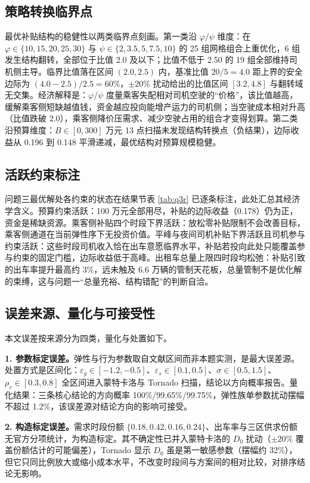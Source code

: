 \documentclass[12pt,a4paper]{ctexart}
\begin{document}
\subsection{策略转换临界点}

最优补贴结构的稳健性以两类临界点刻画。第一类沿 $\varphi/\psi$ 维度：在 $\varphi\in\{10,15,20,25,30\}$ 与 $\psi\in\{2,3.5,5,7.5,10\}$ 的 25 组网格组合上重优化，6 组发生结构翻转，全部位于比值 2.0 及以下；比值不低于 2.50 的 19 组全部维持司机侧主导。临界比值落在区间 $(2.0,2.5)$ 内，基准比值 $20/5=4.0$ 距上界的安全边际为 $(4.0-2.5)/2.5=60\%$，$\pm 20\%$ 扰动给出的比值区间 $[3.2,4.8]$ 与翻转域无交集。经济解释是：$\varphi/\psi$ 度量乘客失配相对司机空驶的“价格”，该比值越高，缓解乘客侧短缺越值钱，资金越应投向能增产运力的司机侧；当空驶成本相对升高（比值跌破 2.0），乘客侧降价压需求、减少空驶占用的组合才变得划算。第二类沿预算维度：$B\in[0,300]$ 万元 13 点扫描未发现结构转换点（负结果），边际收益从 0.196 到 0.148 平滑递减，最优结构对预算规模稳健。

\subsection{活跃约束标注}

问题三最优解处各约束的状态在结果节表 \ref{tab:q3r} 已逐条标注，此处汇总其经济学含义。预算约束活跃：100 万元全部用尽，补贴的边际收益（0.178）仍为正，资金是稀缺资源。乘客侧补贴四个时段下界活跃：放松零补贴限制不会改善目标，乘客侧通道在当前弹性序下无投资价值。平峰与夜间司机补贴下界活跃且司机参与约束活跃：这些时段司机收入恰在出车意愿临界水平，补贴若投向此处只能覆盖参与约束的固定门槛，边际收益低于高峰。出租车总量上限四时段均松弛：补贴引致的出车率提升最高约 3\%，远未触及 6.6 万辆的管制天花板，总量管制不是优化解的束缚，这与问题一“总量充裕、结构错配”的判断自洽。

\subsection{误差来源、量化与可接受性}

本文误差按来源分为四类，量化与处置如下。

\textbf{1. 参数标定误差。}弹性与行为参数取自文献区间而非本题实测，是最大误差源。处置方式是区间化：$\varepsilon_g\in[-1.2,-0.5]$、$\varepsilon_s\in[0.1,0.5]$、$\sigma\in[0.5,1.5]$、$\rho_v\in[0.3,0.8]$ 全区间进入蒙特卡洛与 Tornado 扫描，结论以方向概率报告。量化结果：三条核心结论的方向概率 100\%/99.65\%/99.75\%，弹性族单参数扰动摆幅不超过 1.2\%，该误差源对结论方向的影响可接受。

\textbf{2. 构造标定误差。}需求时段份额 $\{0.18,0.42,0.16,0.24\}$、出车率与三区供求份额无官方分项统计，为构造标定。其不确定性已并入蒙特卡洛的 $D_0$ 扰动（$\pm 20\%$ 覆盖份额估计的可能偏差），Tornado 显示 $D_0$ 虽是第一敏感参数（摆幅约 32\%），但它只同比例放大或缩小成本水平，不改变时段间与方案间的相对比较，对排序结论无影响。
\end{document}
